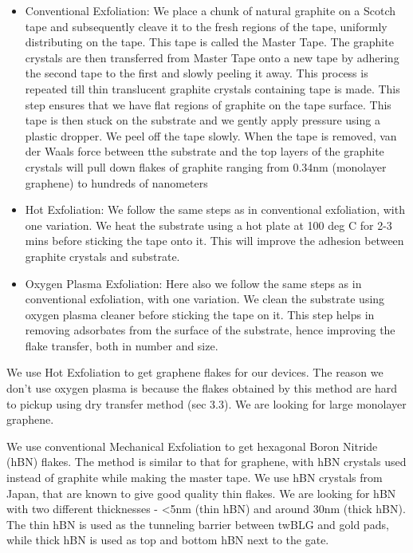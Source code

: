 \begin{itemize}
    \item Conventional Exfoliation:
    We place a chunk of natural graphite on a Scotch tape and subsequently cleave it to the fresh regions of the tape, uniformly distributing on the tape. This tape is called the Master Tape. The graphite crystals are then transferred from Master Tape onto a new tape by adhering the second tape to the first and slowly peeling it away. This process is repeated till thin translucent graphite crystals containing tape is made. This step ensures that we have flat regions of graphite on the tape surface. This tape is then stuck on the substrate and we gently apply pressure using a plastic dropper. We peel off the tape slowly. When the tape is removed, van der Waals force between tthe substrate and the top layers of the graphite crystals will pull down flakes of graphite ranging from 0.34nm (monolayer graphene) to hundreds of nanometers
    \item Hot Exfoliation:
    We follow the same steps as in conventional exfoliation, with one variation. We heat the substrate using a hot plate at 100 deg C for 2-3 mins before sticking the tape onto it. This will improve the adhesion between graphite crystals and substrate.
    \item Oxygen Plasma Exfoliation:
    Here also we follow the same steps as in conventional exfoliation, with one variation. We clean the substrate using oxygen plasma cleaner before sticking the tape on it. This step helps in removing adsorbates from the surface of the substrate, hence improving the flake transfer, both in number and size.
   
    \end{itemize}

We use Hot Exfoliation to get graphene flakes for our devices. The reason we don't use oxygen plasma is because the flakes obtained by this method are hard to pickup using dry transfer method (sec 3.3). We are looking for large monolayer graphene.

We use conventional Mechanical Exfoliation to get hexagonal Boron Nitride (hBN) flakes. The method is similar to that for graphene, with hBN crystals used instead of graphite while making the master tape. We use hBN crystals from Japan, that are known to give good quality thin flakes. We are looking for hBN with two different thicknesses - <5nm (thin hBN) and around 30nm (thick hBN). The thin hBN is used as the tunneling barrier between twBLG and gold pads, while thick hBN is used as top and bottom hBN next to the gate.

